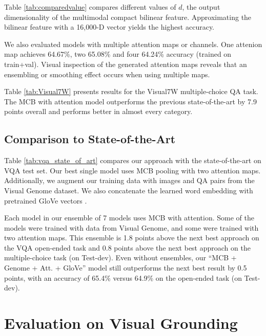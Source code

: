 \documentclass[11pt,letterpaper]{article}
\begin{document}
Table \ref{tab:comparedvalue} compares different values of $d$, the output dimensionality of the multimodal compact bilinear feature. Approximating the bilinear feature with a 16,000-D vector yields the highest accuracy. 

We also evaluated models with multiple attention maps or channels. One attenion map achieves 64.67\%, two
 65.08\% and four 64.24\% accuracy (trained on train+val). Visual inspection of the generated attention maps reveals that an ensembling or smoothing effect occurs when using multiple maps. 





Table \ref{tab:Visual7W} presents results for the Visual7W multiple-choice QA task. The MCB with attention model outperforms the previous state-of-the-art by 7.9 points overall and performs better in almost every category. 

\subsection{Comparison to State-of-the-Art}
\label{sec:eval:stateoftheart}
Table \ref{tab:vqa_state_of_art} compares our approach with the state-of-the-art on VQA test set. Our best single model uses MCB pooling with two attention maps. Additionally, we augment our training data with images and QA pairs from the Visual Genome dataset. We also concatenate the learned word embedding with pretrained GloVe vectors \cite{pennington2014glove}.

Each model in our ensemble of 7 models uses MCB with attention. Some of the models were trained with data from Visual Genome, and some were trained with two attention maps. This ensemble is 1.8 points above the next best approach on the VQA open-ended task and 0.8 points above the next best approach on the multiple-choice task (on Test-dev). Even without ensembles, our ``MCB + Genome + Att. + GloVe'' model still outperforms the next best result by 0.5 points, with an accuracy of 65.4\% versus 64.9\% on the open-ended task (on Test-dev).

\section{Evaluation on Visual Grounding}
\end{document}
